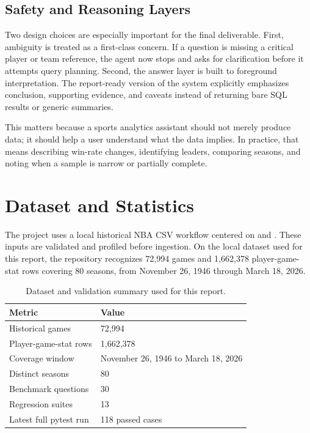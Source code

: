 \documentclass[11pt]{article}
\begin{document}
\subsection{Safety and Reasoning Layers}
Two design choices are especially important for the final deliverable. First, ambiguity is treated as a first-class concern. If a question is missing a critical player or team reference, the agent now stops and asks for clarification before it attempts query planning. Second, the answer layer is built to foreground interpretation. The report-ready version of the system explicitly emphasizes conclusion, supporting evidence, and caveats instead of returning bare SQL results or generic summaries.

This matters because a sports analytics assistant should not merely produce data; it should help a user understand what the data implies. In practice, that means describing win-rate changes, identifying leaders, comparing seasons, and noting when a sample is narrow or partially complete.

\section{Dataset and Statistics}
The project uses a local historical NBA CSV workflow centered on  and . These inputs are validated and profiled before ingestion. On the local dataset used for this report, the repository recognizes 72,994 games and 1,662,378 player-game-stat rows covering 80 seasons, from November 26, 1946 through March 18, 2026.

\begin{table}[H]
    \centering
    \caption{Dataset and validation summary used for this report.}
    \label{tab:dataset-summary}
    \begin{tabular}{@{}ll@{}}
        \toprule
        Metric & Value \\
        \midrule
        Historical games & 72,994 \\
        Player-game-stat rows & 1,662,378 \\
        Coverage window & November 26, 1946 to March 18, 2026 \\
        Distinct seasons & 80 \\
        Benchmark questions & 30 \\
        Regression suites & 13 \\
        Latest full pytest run & 118 passed cases \\
        \bottomrule
    \end{tabular}
\end{table}
\end{document}

